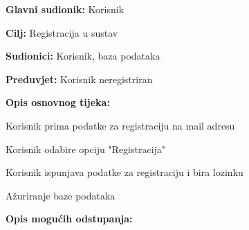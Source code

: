 					\noindent {}
					\begin{packed_item}
						
						\item \textbf{Glavni sudionik: }Korisnik
						\item  \textbf{Cilj:} Registracija u sustav
						\item  \textbf{Sudionici:} Korisnik, baza podataka
						\item  \textbf{Preduvjet:} Korisnik neregistriran
						\item  \textbf{Opis osnovnog tijeka:}
						
						\item[] \begin{packed_enum}
							
							\item Korisnik prima podatke za registraciju na mail adresu
							\item Korisnik odabire opciju "Registracija"
							\item Korisnik ispunjava podatke za registraciju i bira lozinku
							\item Ažuriranje baze podataka
						\end{packed_enum}
						
						\item  \textbf{Opis mogućih odstupanja:}
							
					\end{packed_item}
				
